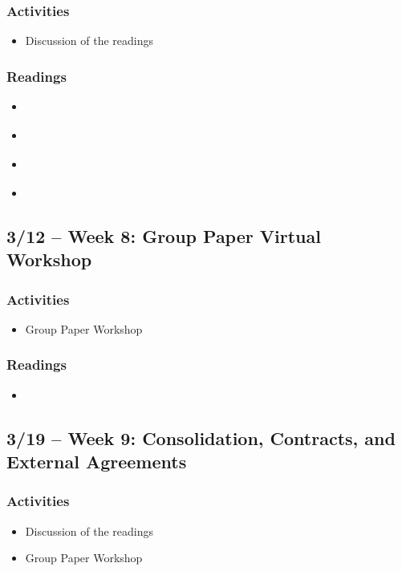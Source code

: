 \documentclass[12pt, letterpaper]{article}
\begin{document}
    \subsubsection*{Activities}
        \begin{itemize}
            \item Discussion of the readings
        \end{itemize}
    \subsubsection*{Readings}
        \begin{itemize}
            \item \citet[chapter 7]{Agranoff2012}
            \item \citet[chapter 9]{Agranoff2023}
            \item \citet[chapter 8]{Henderson2015}
            \item \citet[chapters 3--4]{OLeary2009}
        \end{itemize}
 
\subsection*{3/12 -- Week 8: Group Paper Virtual Workshop}

    \subsubsection*{Activities}
        \begin{itemize}
            \item Group Paper Workshop
        \end{itemize}
    \subsubsection*{Readings}
        \begin{itemize}
            \item \citet{ostromMarketsStatesPolycentric2010}
        \end{itemize}

\subsection*{3/19 -- Week 9: Consolidation, Contracts, and External Agreements}
    \subsubsection*{Activities}
        \begin{itemize}
            \item Discussion of the readings
            \item Group Paper Workshop
        \end{itemize}
\end{document}
